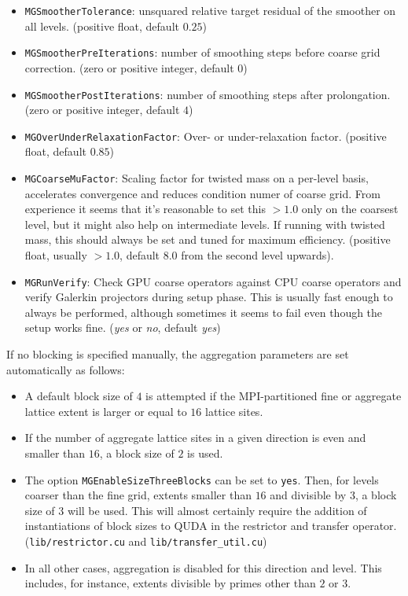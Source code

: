 \begin{itemize}
  \item{ \texttt{MGSmootherTolerance}: unsquared relative target residual of the smoother on all levels. (positive float, default $0.25$) }
  \item{ \texttt{MGSmootherPreIterations}: number of smoothing steps before coarse grid correction. (zero or positive integer, default $0$)}
  \item{ \texttt{MGSmootherPostIterations}: number of smoothing steps after prolongation. (zero or positive integer, default $4$)}
  \item{ \texttt{MGOverUnderRelaxationFactor}: Over- or under-relaxation factor. (positive float, default $0.85$)}
  \item{ \texttt{MGCoarseMuFactor}: Scaling factor for twisted mass on a per-level basis, accelerates convergence and reduces condition numer of coarse grid. From experience it seems that it's reasonable to set this $>1.0$ only on the coarsest level, but it might also help on intermediate levels. If running with twisted mass, this should always be set and tuned for maximum efficiency. (positive float, usually $ > 1.0$, default $8.0$ from the second level upwards).}
  \item{ \texttt{MGRunVerify}: Check GPU coarse operators against CPU coarse operators and verify Galerkin projectors during setup phase. This is usually fast enough to always be performed, although sometimes it seems to fail even though the setup works fine. (\emph{yes} or \emph{no}, default \emph{yes}) } 
\end{itemize}

If no blocking is specified manually, the aggregation parameters are set automatically as follows:
\begin{itemize}
  \item{ A default block size of $4$ is attempted if the MPI-partitioned fine or aggregate lattice extent is larger or equal to $16$ lattice sites. }
  \item{ If the number of aggregate lattice sites in a given direction is even and smaller than $16$, a block size of $2$ is used. }
  \item{ The option \texttt{MGEnableSizeThreeBlocks} can be set to \texttt{yes}. Then, for levels coarser than the fine grid, extents smaller than $16$ and divisible by $3$, a block size of $3$ will be used. This will almost certainly require the addition of instantiations of block sizes to QUDA in the restrictor and transfer operator. (\texttt{lib/restrictor.cu} and \texttt{lib/transfer\_util.cu}) }
  \item{ In all other cases, aggregation is disabled for this direction and level. This includes, for instance, extents divisible by primes other than $2$ or $3$. }
\end{itemize}


